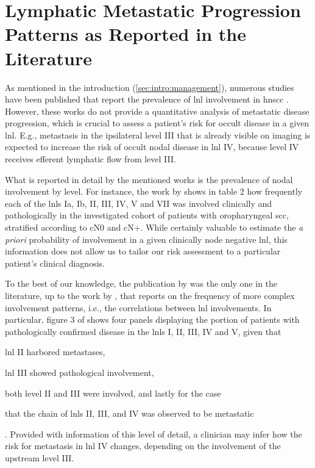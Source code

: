 \documentclass[\relativeRoot/main.tex]{subfiles}
\begin{document}
\section[Progression Patterns in the Literature]{Lymphatic Metastatic Progression Patterns as Reported in the Literature}
\label{sec:previous_work:sanguineti}

As mentioned in the introduction (\cref{sec:intro:management}), numerous studies have been published that report the prevalence of \gls{lnl} involvement in \gls{hnscc} \cite{candela_patterns_1990,shah_patterns_1990,woolgar_histological_1999,woolgar_topography_2007,chao_determination_2002,vauterin_patterns_2006,razfar_incidence_2009,ho_patterns_2012,bauwens_prevalence_2021}. However, these works do not provide a quantitative analysis of metastatic disease progression, which is crucial to assess a patient's risk for occult disease in a given \gls{lnl}. E.g., metastasis in the ipsilateral level III that is already visible on imaging is expected to increase the risk of occult nodal disease in \gls{lnl} IV, because level IV receives efferent lymphatic flow from level III.

What is reported in detail by the mentioned works is the prevalence of nodal involvement by level. For instance, the work by  shows in table 2 how frequently each of the \glspl{lnl} Ia, Ib, II, III, IV, V and VII was involved clinically and pathologically in the investigated cohort of patients with oropharyngeal \gls{scc}, stratified according to cN0 and cN+. While certainly valuable to estimate the \emph{a priori} probability of involvement in a given clinically node negative \gls{lnl}, this information does not allow us to tailor our risk assessment to a particular patient's clinical diagnosis.

To the best of our knowledge, the publication by  was the only one in the literature, up to the work by , that reports on the frequency of more complex involvement patterns, i.e., the correlations between \gls{lnl} involvements. In particular, figure 3 of  shows four panels displaying the portion of patients with pathologically confirmed disease in the \glspl{lnl} I, II, III, IV and V, given that
\begin{enumerate*}[label={(\alph*)}]
    \item \gls{lnl} II harbored metastases,
    \item \gls{lnl} III showed pathological involvement,
    \item both level II and III were involved, and lastly for the case
    \item that the chain of \glspl{lnl} II, III, and IV was observed to be metastatic
\end{enumerate*}. Provided with information of this level of detail, a clinician may infer how the risk for metastasis in \gls{lnl} IV changes, depending on the involvement of the upstream level III.
\end{document}
